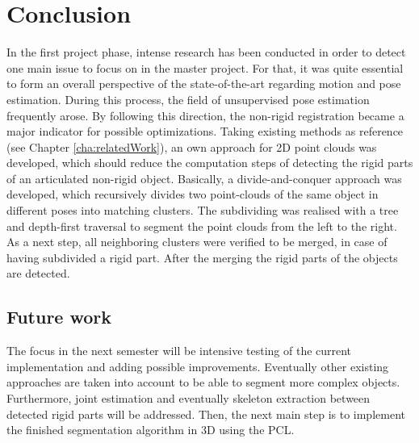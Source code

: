 \chapter{Conclusion}
\label{cha:Closing}

In the first project phase, intense research has been conducted in order to detect one main issue to focus on in the master project. For that, it was quite essential to form an overall perspective of the state-of-the-art regarding motion and pose estimation. During this process, the field of unsupervised pose estimation frequently arose. By following this direction, the non-rigid registration became a major indicator for possible optimizations. Taking existing methods as reference (see Chapter \ref{cha:relatedWork}), an own approach for 2D point clouds was developed, which should reduce the computation steps of detecting the rigid parts of an articulated non-rigid object. Basically, a divide-and-conquer approach was developed, which recursively divides two point-clouds of the same object in different poses into matching clusters. The subdividing was realised with a tree and depth-first traversal to segment the point clouds from the left to the right. As a next step, all neighboring clusters were verified to be merged, in case of having subdivided a rigid part. After the merging the rigid parts of the objects are detected. 
	
\section{Future work}
	
The focus in the next semester will be intensive testing of the current implementation and adding possible improvements. Eventually other existing approaches are taken into account to be able to segment more complex objects. Furthermore, joint estimation and eventually skeleton extraction between detected rigid parts will be addressed. Then, the next main step is to implement the finished segmentation algorithm in 3D using the PCL.
